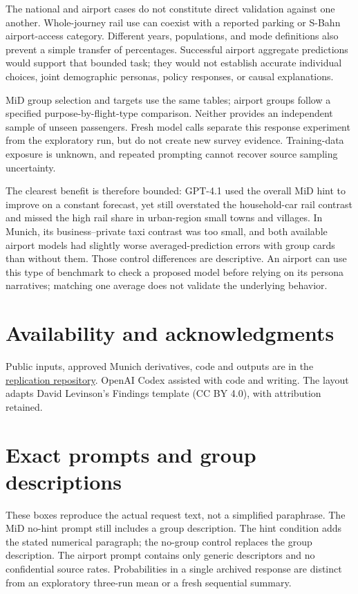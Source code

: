 \documentclass{article}
\begin{document}
The national and airport cases do not constitute direct validation against one another. Whole-journey rail use can coexist with a reported parking or S-Bahn airport-access category. Different years, populations, and mode definitions also prevent a simple transfer of percentages. Successful airport aggregate predictions would support that bounded task; they would not establish accurate individual choices, joint demographic personas, policy responses, or causal explanations.

MiD group selection and targets use the same tables; airport groups follow a specified purpose-by-flight-type comparison. Neither provides an independent sample of unseen passengers. Fresh model calls separate this response experiment from the exploratory run, but do not create new survey evidence. Training-data exposure is unknown, and repeated prompting cannot recover source sampling uncertainty.

The clearest benefit is therefore bounded: GPT-4.1 used the overall MiD hint to improve on a constant forecast, yet still overstated the household-car rail contrast and missed the high rail share in urban-region small towns and villages. In Munich, its business--private taxi contrast was too small, and both available airport models had slightly worse averaged-prediction errors with group cards than without them. Those control differences are descriptive. An airport can use this type of benchmark to check a proposed model before relying on its persona narratives; matching one average does not validate the underlying behavior.

\section*{Availability and acknowledgments}
Public inputs, approved Munich derivatives, code and outputs are in the \href{https://github.com/jtzach/air-passenger-LLM-PDM-study}{replication repository}. OpenAI Codex assisted with code and writing. The layout adapts David Levinson's Findings template (CC BY 4.0), with attribution retained.

\clearpage
\appendix
\section{Exact prompts and group descriptions}\label{app:prompts}
These boxes reproduce the actual request text, not a simplified paraphrase. The MiD no-hint prompt still includes a group description. The hint condition adds the stated numerical paragraph; the no-group control replaces the group description. The airport prompt contains only generic descriptors and no confidential source rates. Probabilities in a single archived response are distinct from an exploratory three-run mean or a fresh sequential summary.


\clearpage


\end{document}
